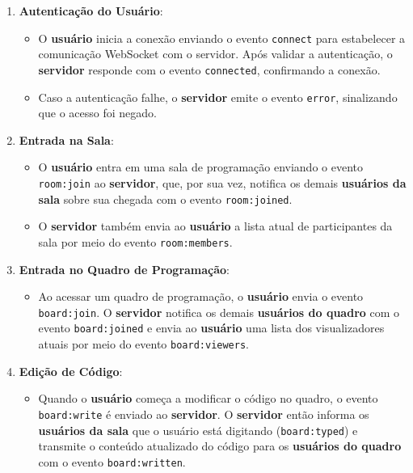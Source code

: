 \begin{enumerate}
    \item \textbf{Autenticação do Usuário}:
    \begin{itemize}
        \item O \textbf{usuário} inicia a conexão enviando o evento \texttt{connect} para estabelecer a comunicação WebSocket com o servidor. Após validar a autenticação, o \textbf{servidor} responde com o evento \texttt{connected}, confirmando a conexão.
        \item Caso a autenticação falhe, o \textbf{servidor} emite o evento \texttt{error}, sinalizando que o acesso foi negado.
    \end{itemize}

    \item \textbf{Entrada na Sala}:
    \begin{itemize}
        \item O \textbf{usuário} entra em uma sala de programação enviando o evento \texttt{room:join} ao \textbf{servidor}, que, por sua vez, notifica os demais \textbf{usuários da sala} sobre sua chegada com o evento \texttt{room:joined}.
        \item O \textbf{servidor} também envia ao \textbf{usuário} a lista atual de participantes da sala por meio do evento \texttt{room:members}.
    \end{itemize}

    \item \textbf{Entrada no Quadro de Programação}:
    \begin{itemize}
        \item Ao acessar um quadro de programação, o \textbf{usuário} envia o evento \texttt{board:join}. O \textbf{servidor} notifica os demais \textbf{usuários do quadro} com o evento \texttt{board:joined} e envia ao \textbf{usuário} uma lista dos visualizadores atuais por meio do evento \texttt{board:viewers}.
    \end{itemize}

    \item \textbf{Edição de Código}:
    \begin{itemize}
        \item Quando o \textbf{usuário} começa a modificar o código no quadro, o evento \texttt{board:write} é enviado ao \textbf{servidor}. O \textbf{servidor} então informa os \textbf{usuários da sala} que o usuário está digitando (\texttt{board:typed}) e transmite o conteúdo atualizado do código para os \textbf{usuários do quadro} com o evento \texttt{board:written}.
    \end{itemize}


\end{enumerate}
